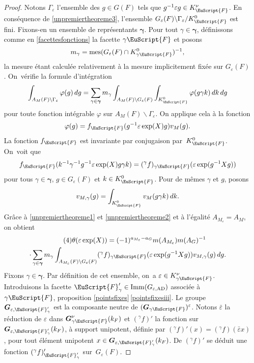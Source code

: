 \documentclass[JEP,XML,SOM,Unicode,francais]{cedram}
\let\mathcal \EuScript
\let\epsilon\varepsilon
\newcommand{\AD}{\mathrm{AD}}
\newcommand{\Imm}{\mathrm{Imm}}
\DeclareMathOperator{\mes}{mes}
\newcommand{\bG}{\boldsymbol{G}}
\newcommand{\cF}{\mathcal{F}}
\theoremstyle{plain}
\theoremstyle{definition}
\begin{document}
\begin{proof}
Notons $\Gamma_{\epsilon}$ l'ensemble des $g\in G(F)$ tels que $g^{-1}\epsilon g\in K_{\cF}^{\nu}$. En conséquence de \eqref{unpremiertheoreme3}, l'ensemble $G_{\epsilon}(F)\backslash \Gamma_{\epsilon}/K_{\cF}^0$ est fini. Fixons-en un ensemble de représentants $\boldsymbol{\gamma}$. Pour tout $\gamma\in \boldsymbol{\gamma}$, définissons comme en \ref{facettesfonctions} la facette $\gamma\cF$ et posons
\[
m_{\gamma}=\mes(G_{\epsilon}(F)\cap K_{\gamma\cF}^0)^{-1},
\]
la mesure étant calculée relativement à la mesure implicitement fixée sur $G_{\epsilon}(F)$. On~vérifie la formule d'intégration\vspace*{-3pt}
\[
\int_{A_{M}(F)\backslash\Gamma_{\epsilon}}\varphi(g)\,dg=\sum_{\gamma\in \boldsymbol{\gamma}}m_{\gamma}\int_{A_{M}(F)\backslash G_{\epsilon}(F)}\int_{K_{\cF}^0}\varphi(g\gamma k)\,dk\,dg
\]
pour toute fonction intégrable $\varphi$ sur $A_{M}(F)\backslash \Gamma_{\epsilon}$. On applique cela à la fonction\vspace*{-3pt}\enlargethispage{.5\baselineskip}%
\[
\varphi(g)=f_{\cF}(g^{-1}\epsilon \exp(X) g)v_{M}(g).
\]
La fonction $f_{\cF} $ est invariante par conjugaison par~$K_{\cF}^0$. On~voit que\vspace*{-3pt}
\[
f_{\cF}(k^{-1}\gamma^{-1}g^{-1}\epsilon \exp(X)g \gamma k)=(^{\gamma}f)_{\gamma\cF}(\epsilon \exp(g^{-1}Xg))
\]
pour tous $\gamma\in \boldsymbol{\gamma}$, $g\in G_{\epsilon}(F)$ et $k\in K_{\cF}^0$. Pour de mêmes
$\gamma$ et $g$, posons\vspace*{-3pt}
\[
v_{M,\gamma}(g)=\int_{K_{\cF}^0}v_{M}(g\gamma k)\,dk.
\]
Grâce à \eqref{unpremiertheoreme1} et \eqref{unpremiertheoreme2} et à l'égalité $A_{M_{\epsilon}}=A_{M}$, on obtient\vspace*{-3pt}
\begin{multline*}\tag{4}\label{unpremiertheoreme4}
\theta(\epsilon \exp(X))=(-1)^{a_{M_{\epsilon}}-a_{G}}m(A_{M_{\epsilon}})m(A_{G})^{-1}\\
\cdot\sum_{\gamma\in \boldsymbol{\gamma}}m_{\gamma}
\int_{A_{M_{\epsilon}}(F)\backslash G_{\epsilon}(F)}(^{\gamma}f)_{\gamma\cF}(\epsilon \exp(g^{-1}X g))v_{M,\gamma} (g)\,dg.
\end{multline*}
Fixons $\gamma\in \boldsymbol{\gamma}$.
Par définition de cet ensemble, on~a $\epsilon\in K_{\gamma\cF}^{\nu}$. Introduisons la facette $\cF'_{\gamma}\in \Imm(G_{\epsilon,\AD})$ associée à $\gamma\cF$, \cf proposition \ref{pointsfixes}\,\eqref{pointsfixesiii}. Le groupe $\bG_{\epsilon,\cF_{\gamma}'}$ est la composante neutre de $(\bG_{\gamma\cF})^{\epsilon}$.
Notons $\bar{\epsilon}$ la réduction de $\epsilon$ dans $\bG^{\nu}_{\gamma\cF}(k_{F})$ et $(^{\gamma}f)'$ la fonction sur $\bG_{\epsilon,\cF'_{\gamma}}(k_{F})$, à support unipotent, définie par $(^{\gamma}f)'(x)=(^{\gamma}f)(\bar{\epsilon}x)$, pour tout élément unipotent $x\in \bG_{\epsilon,\cF'_{\gamma}}(k_{F})$. De $(^{\gamma}f)'$ se déduit une fonction $(^{\gamma}f)'_{\cF'_{\gamma}}$ sur~$G_{\epsilon}(F)$.


\end{proof}
\end{document}
